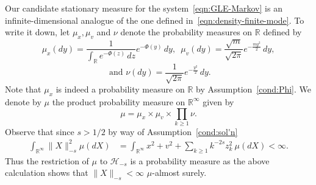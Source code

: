 \documentclass[11pt]{amsart}
\theoremstyle{definition}
\newcommand{\rbb}{\mathbb{R}}
\renewcommand{\H}{\mathcal{H}}
\theoremstyle{definition}
\theoremstyle{plain}
\numberwithin{equation}{section}
\begin{document}
Our candidate stationary measure for the system~\eqref{eqn:GLE-Markov} is an infinite-dimensional analogue of the one defined in~\eqref{eqn:density-finite-mode}.  To write it down, let $\mu_x, \mu_v$ and $\nu$ denote the probability measures on $\rbb$ defined by 
\begin{equation} \label{defn:mu-x}
\mu_x(dy)=\frac{1}{\int_\rbb e^{-\Phi(z)} \, dz} e^{-\Phi(y)} \, dy, \,\,\, \mu_v(dy) = \frac{\sqrt{m}}{\sqrt{2\pi}}e^{-\frac{m y^2}{2}} \, dy, 
\end{equation}
\begin{displaymath}
\text{ and }\nu(dy) = \frac{1}{\sqrt{2\pi}} e^{-\frac{y^2}{2}}\, dy. 
\end{displaymath}
Note that $\mu_x$ is indeed a probability measure on $\rbb$ by Assumption~\ref{cond:Phi}.  
We denote by $\mu$ the product probability measure on $\rbb^\infty$ given by 
\begin{equation}\label{eqn:mu}
\mu=\mu_x\times\mu_v\times\prod_{k\geq 1}\nu.
\end{equation}
Observe that since $s>1/2$ by way of Assumption~\ref{cond:sol'n}
\begin{equation} \label{ineq:mu:second-moment}
\begin{aligned}
\int_{\rbb^\infty}\!\!\! \|X\|^2_{-s}\mu(dX) &=   \int_{\rbb^\infty}\!\!\! x^2+v^2+\sum_{k\geq 1}k^{-2s}z_k^2\ \mu(dX)< \infty.
\end{aligned}
\end{equation}
Thus the restriction of $\mu$ to $\H_{-s}$ is a probability measure as the above calculation shows that $\|X\|_{-s} < \infty$ $\mu$-almost surely. 
\end{document}
